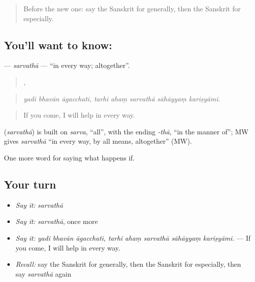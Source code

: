 \label{lesson:SA-C381-sarvatha}



\begin{quote}
Before the new one: say the Sanskrit for generally, then the Sanskrit for especially.
\end{quote}

\subsection*{You'll want to know: }
\textbf{} — \emph{sarvathā} — \textquotedblleft{}in every way; altogether\textquotedblright{}.

\begin{quote}
  ,     
\end{quote}

\begin{quote}
\emph{yadi bhavān āgacchati, tarhi ahaṃ sarvathā sāhāyyaṃ kariṣyāmi.}
\end{quote}

\begin{quote}
If you come, I will help in every way.
\end{quote}

\begin{cousinweb}
\textbf{} (\emph{sarvathā}) is built on \emph{sarva}, \textquotedblleft{}all\textquotedblright{}, with the ending \emph{-thā}, \textquotedblleft{}in the manner of\textquotedblright{}; MW gives \emph{sarvathā} \textquotedblleft{}in every way, by all means, altogether\textquotedblright{} (MW).
\end{cousinweb}

\begin{grammarlens}[title={What you've built}]
One more word for saying what happens if.
\end{grammarlens}

\subsection*{Your turn}
\begin{itemize}
\raggedright
  \item \emph{Say it:} \emph{sarvathā}
  \item \emph{Say it:} \emph{sarvathā}, once more
  \item \emph{Say it:} \emph{yadi bhavān āgacchati, tarhi ahaṃ sarvathā sāhāyyaṃ kariṣyāmi.} — If you come, I will help in every way.
  \item \emph{Recall:} say the Sanskrit for generally, then the Sanskrit for especially, then say \emph{sarvathā} again
\end{itemize}

